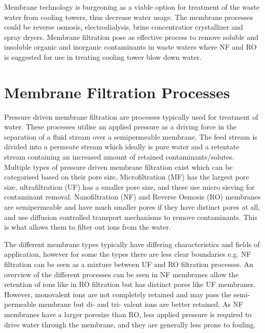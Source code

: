 









Membrane technology is burgeoning as a viable option for treatment of the waste water from cooling towers, thus decrease water usage. The membrane processes could be reverse osmosis, electrodialysis, brine concentratior crystallizer and spray dryers. \citep{kaliappan_RecoveryReuseWater_2005} 
Membrane filtration pose as effective process to remove soluble and insoluble organic and inorganic contaminants in waste waters where NF and RO is suggested for use in treating cooling tower blow down water. \citep{farahanniRecoveryCoolingTower_2016}



\section{Membrane Filtration Processes}
Pressure driven membrane filtration are processes typically used for treatment of water.
These processes utilise an applied pressure as a driving force in the separation of a fluid stream over a semipermeable membrane. 
The feed stream is divided into a permeate stream which ideally is pure water and a retentate stream containing an increased amount of retained contaminants/solutes. 
Multiple types of pressure driven membrane filtration exist which can be categorised based on their pore size. 
Microfiltration (MF) has the largest pore size, ultrafiltration (UF) has a smaller pore size, and these use micro sieving for contaminant removal.
Nanofiltration (NF) and Reverse Osmosis (RO) membranes are semipermeable and have much smaller pores if they have distinct pores at all, and use diffusion controlled transport mechanisms to remove contaminants.
This is what allows them to filter out ions from the water.

The different membrane types typically have differing characteristics and fields of application, however for some the types there are less clear boundaries e.g. NF filtration can be seen as a mixture between UF and RO filtration processes.\citep{keo}
An overview of the different processes can be seen in   
NF membranes allow the retention of ions like in RO filtration but has distinct pores like UF membranes. %
However, monovalent ions are not completely retained and may pass the semi-permeable membrane but di- and tri- valent ions are better retained. 
As NF membranes have a larger poresize than RO, less applied pressure is required to drive water through the membrane, and they are generally less prone to fouling. \citep{keo}

